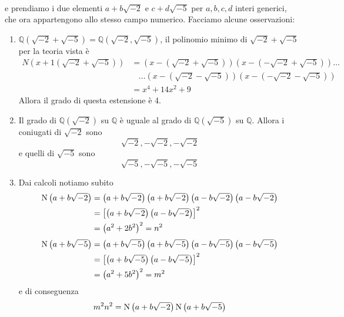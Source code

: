 \begin{esempio}
\begin{align*}
	\end{align*}
	e prendiamo i due elementi $a+b\sqrt{-2}$ e $c+d\sqrt{-5}$ per $a,b,c,d$ interi generici, che ora appartengono allo stesso campo numerico. Facciamo alcune osservazioni:
	\begin{enumerate}
		\item $\mathbb{Q}\left(\sqrt{-2}+\sqrt{-5}\right)=\mathbb{Q}\left(\sqrt{-2},\sqrt{-5}\right)$, il polinomio minimo di $\sqrt{-2}+\sqrt{-5}$ per la teoria vista è
		\begin{align*}
		N(x+1(\sqrt{-2}+\sqrt{-5})) & = \left(x-\left(\sqrt{-2}+\sqrt{-5}\right)\right) \left(x-\left(-\sqrt{-2}+\sqrt{-5}\right)\right)\dots\\
		& \ \ \ \ \dots \left(x-\left(\sqrt{-2}-\sqrt{-5}\right)\right)\left(x-\left(-\sqrt{-2}-\sqrt{-5}\right)\right) \\
		&= x^4+14x^2+9
		\end{align*}
		Allora il grado di questa estensione è 4.
		\item Il grado di $\mathbb{Q}\left(\sqrt{-2}\right)$ su $\mathbb{Q}$ è uguale al grado di $\mathbb{Q}\left(\sqrt{-5}\right)$ su $\mathbb{Q}$. Allora i coniugati di $\sqrt{-2}$ sono 
		\begin{equation*}
		\sqrt{-2},-\sqrt{-2},-\sqrt{-2}
		\end{equation*}
		e quelli di $\sqrt{-5}$ sono 
		\begin{equation*}
		\sqrt{-5},-\sqrt{-5},-\sqrt{-5}
		\end{equation*}
		\item Dai calcoli notiamo subito
		\begin{align*}
		\operatorname{N}\left(a+b\sqrt{-2}\right)&=\left(a+b\sqrt{-2}\right)\left(a+b\sqrt{-2}\right)\left(a-b\sqrt{-2}\right)\left(a-b\sqrt{-2}\right)\\
		&=\left[\left(a+b\sqrt{-2}\right)\left(a-b\sqrt{-2}\right)\right]^2\\
		&=\left(a^2+2b^2\right)^2=n^2
		\end{align*}
		\begin{align*}
		\operatorname{N}\left(a+b\sqrt{-5}\right)&=\left(a+b\sqrt{-5}\right)\left(a+b\sqrt{-5}\right)\left(a-b\sqrt{-5}\right)\left(a-b\sqrt{-5}\right)\\
		&=\left[\left(a+b\sqrt{-5}\right)\left(a-b\sqrt{-5}\right)\right]^2\\
		&=\left(a^2+5b^2\right)^2=m^2
		\end{align*}
		e di conseguenza 
		\begin{align*}
		m^2n^2&=\N\left(a+b\sqrt{-2}\right)\N\left(a+b\sqrt{-5}\right)\\

\end{align*}
\end{enumerate}
\end{esempio}
